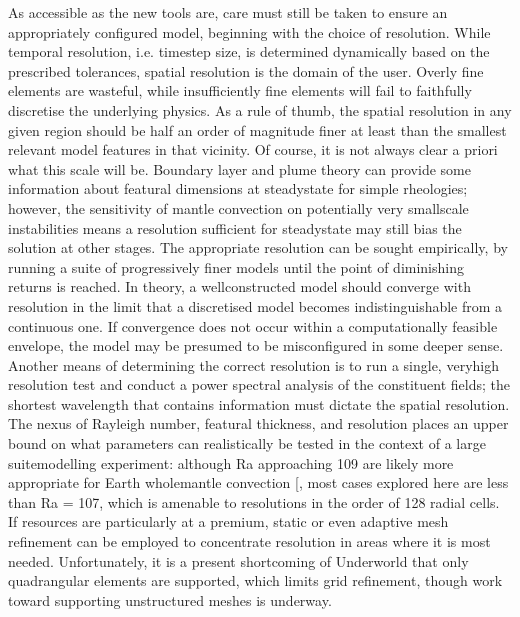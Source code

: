 \documentclass[letterpaper,10pt,english]{jupyterBook}
\begin{document}
\sphinxAtStartPar
As accessible as the new tools are, care must still be taken to ensure an appropriately configured model, beginning with the choice of resolution. While temporal resolution, i.e. timestep size, is determined dynamically based on the prescribed tolerances, spatial resolution is the domain of the user. Overly fine elements are wasteful, while insufficiently fine elements will fail to faithfully discretise the underlying physics. As a rule of thumb, the spatial resolution in any given region should be half an order of magnitude finer at least than the smallest relevant model features in that vicinity. Of course, it is not always clear a priori what this scale will be. Boundary layer and plume theory can provide some information about featural dimensions at steady\sphinxhyphen{}state for simple rheologies; however, the sensitivity of mantle convection on potentially very small\sphinxhyphen{}scale instabilities means a resolution sufficient for steady\sphinxhyphen{}state may still bias the solution at other stages. The appropriate resolution can be sought empirically, by running a suite of progressively finer models until the point of diminishing returns is reached. In theory, a well\sphinxhyphen{}constructed model should converge with resolution in the limit that a discretised model becomes indistinguishable from a continuous one. If convergence does not occur within a computationally feasible envelope, the model may be presumed to be misconfigured in some deeper sense. Another means of determining the correct resolution is to run a single, very\sphinxhyphen{}high resolution test and conduct a power spectral analysis of the constituent fields; the shortest wavelength that contains information must dictate the spatial resolution. The nexus of Rayleigh number, featural thickness, and resolution places an upper bound on what parameters can realistically be tested in the context of a large suite\sphinxhyphen{}modelling experiment: although Ra approaching 109 are likely more appropriate for Earth whole\sphinxhyphen{}mantle convection {[}\sphinxcite{references:id339}{]}, most cases explored here are less than Ra = 107, which is amenable to resolutions in the order of 128 radial cells. If resources are particularly at a premium, static or even adaptive mesh refinement can be employed to concentrate resolution in areas where it is most needed. Unfortunately, it is a present shortcoming of Underworld that only quadrangular elements are supported, which limits grid refinement, though work toward supporting unstructured meshes is underway.
\end{document}
